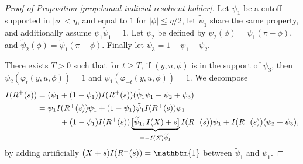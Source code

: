 \documentclass[10pt]{amsart}
\theoremstyle{plain}
\theoremstyle{definition}
\begin{document}
\begin{proof}[Proof of Proposition \ref{prop:bound-indicial-resolvent-holder}]
Let $\psi_1$ be a cutoff supported in $|\phi|< \eta$, and equal to $1$ for $|\phi|\leq \eta/2$, let $\tilde{\psi}_1$ share the same property, and additionally assume $\psi_1\tilde{\psi}_1=1$. Let $\psi_2$ be defined by $\psi_2(\phi)=\psi_1(\pi-\phi)$, and $\tilde{\psi}_2(\phi)=\tilde{\psi}_1(\pi-\phi)$. Finally let $\psi_3=1-\psi_1-\psi_2$.

There exists $T>0$ such that for $t\geq T$, if $(y,u,\phi)$ is in the support of $\psi_3$, then $\psi_2(\varphi_t(y,u,\phi))=1$ and $\psi_1(\varphi_{-t}(y,u,\phi)) = 1$. We decompose\vspace*{-3pt}
\[
\begin{split}
I(R^+(s)) &= (\psi_1 + (1-\psi_1))I(R^+(s)) (\widetilde{\psi}_1\psi_1+\psi_2+\psi_3) \\
& = \psi_1 I(R^+(s))\psi_1 + (1-\psi_1)\tilde{\psi}_1 I(R^+(s)) \psi_1 \\
&\hspace*{1cm} + (1-\psi_1) I(R^+(s)) \underbrace{[\widetilde{\psi}_1, I(X)+s]}_{=-I(X) \widetilde{\psi}_1} I(R^+(s))\psi_1 + I(R^+(s)) (\psi_2+\psi_3),
\end{split}
\]
by adding artificially $(X+s)I(R^+(s))=\mathbbm{1}$ between $\widetilde{\psi}_1$ and $\psi_1$.


\end{proof}
\end{document}
